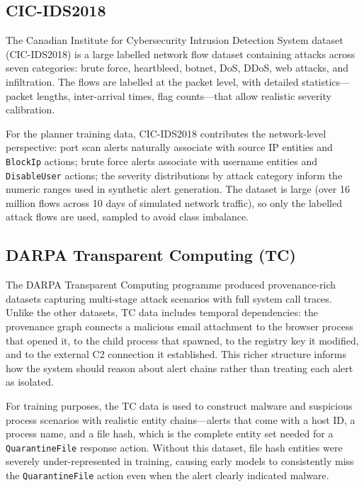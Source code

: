 \subsection{CIC-IDS2018}

The Canadian Institute for Cybersecurity Intrusion Detection System dataset (CIC-IDS2018) \cite{sharafaldin2018cic} is a large labelled network flow dataset containing attacks across seven categories: brute force, heartbleed, botnet, DoS, DDoS, web attacks, and infiltration. The flows are labelled at the packet level, with detailed statistics---packet lengths, inter-arrival times, flag counts---that allow realistic severity calibration.

For the planner training data, CIC-IDS2018 contributes the network-level perspective: port scan alerts naturally associate with source IP entities and \texttt{BlockIp} actions; brute force alerts associate with username entities and \texttt{DisableUser} actions; the severity distributions by attack category inform the numeric ranges used in synthetic alert generation. The dataset is large (over 16 million flows across 10 days of simulated network traffic), so only the labelled attack flows are used, sampled to avoid class imbalance.

\subsection{DARPA Transparent Computing (TC)}

The DARPA Transparent Computing programme \cite{darpatc} produced provenance-rich datasets capturing multi-stage attack scenarios with full system call traces. Unlike the other datasets, TC data includes temporal dependencies: the provenance graph connects a malicious email attachment to the browser process that opened it, to the child process that spawned, to the registry key it modified, and to the external C2 connection it established. This richer structure informs how the system should reason about alert chains rather than treating each alert as isolated.

For training purposes, the TC data is used to construct malware and suspicious process scenarios with realistic entity chains---alerts that come with a host ID, a process name, and a file hash, which is the complete entity set needed for a \texttt{QuarantineFile} response action. Without this dataset, file hash entities were severely under-represented in training, causing early models to consistently miss the \texttt{QuarantineFile} action even when the alert clearly indicated malware.

